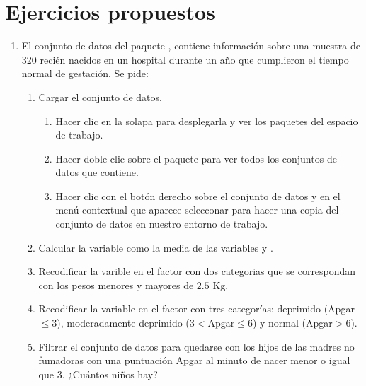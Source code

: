 \section{Ejercicios propuestos}
\begin{enumerate}[leftmargin=*]
\item  El conjunto de datos  del paquete , contiene información sobre una
muestra de 320 recién nacidos en un hospital durante un año que cumplieron el tiempo normal de gestación. 
Se pide:
\begin{enumerate}
\item Cargar el conjunto de datos.
\begin{indicacion}
\begin{enumerate}
\item Hacer clic en la solapa  para desplegarla y ver los paquetes del espacio de trabajo. 
\item Hacer doble clic sobre el paquete  para ver todos los conjuntos de datos que contiene. 
\item Hacer clic con el botón derecho sobre el conjunto de datos  y en el menú contextual que
aparece selecconar  para hacer una copia del conjunto de datos en nuestro entorno de trabajo. 
\end{enumerate}
\end{indicacion}

\item Calcular la variable  como la media de las variables  y .
\item Recodificar la varible  en el factor  con dos categorias que se
correspondan con los pesos menores y mayores de $2.5$ Kg.
\item Recodificar la variable  en el factor  con tres categorías: deprimido
(Apgar$\leq 3$), moderadamente deprimido ($3<$Apgar$\leq 6$) y normal (Apgar$>6$).
\item Filtrar el conjunto de datos para quedarse con los hijos de las madres no fumadoras con una puntuación Apgar al
minuto de nacer menor o igual que 3. ¿Cuántos niños hay?
\end{enumerate}
\end{enumerate}